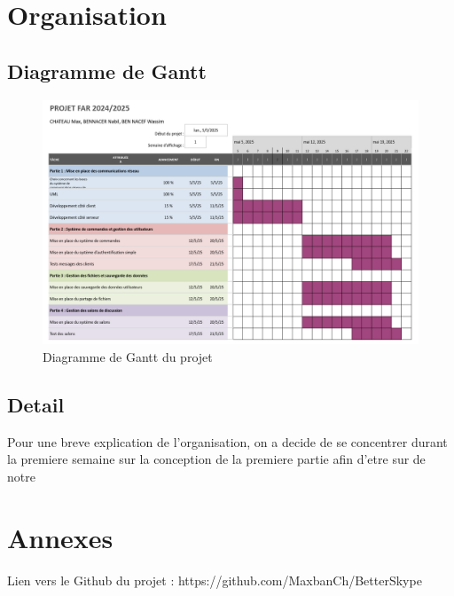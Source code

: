 \documentclass{cs-moi}
\begin{document}
\subsubsection{}

\newpage
\section{Organisation}

\subsection{Diagramme de Gantt}

\begin{figure}[h!]
    \includegraphics[width=0.95\linewidth]{Gantt.png}
    \caption{Diagramme de Gantt du projet}
    \centering
\end{figure}

\subsection{Detail}
Pour une breve explication de l'organisation, on a decide de se concentrer durant la premiere semaine sur la conception de la premiere partie afin d'etre sur de notre 

\section{Annexes}
Lien vers le Github du projet : https://github.com/MaxbanCh/BetterSkype
\end{document}
